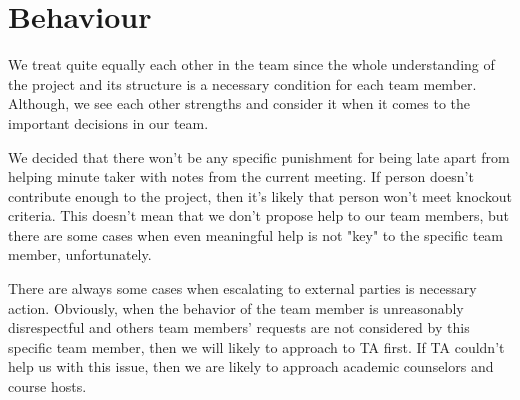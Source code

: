 \section{Behaviour}

We treat quite equally each other in the team since the whole understanding of the project and its structure is a necessary condition for each team member.
Although, we see each other strengths and consider it when it comes to the important decisions in our team.

We decided that there won't be any specific punishment for being late apart from helping minute taker with notes from the current meeting.
If person doesn't contribute enough to the project, then it's likely that person won't meet knockout criteria.
This doesn't mean that we don't propose help to our team members, but there are some cases when even meaningful help
is not "key" to the specific team member, unfortunately.

There are always some cases when escalating to external parties is necessary action.
Obviously, when the behavior of the team member is unreasonably disrespectful and others team members'
requests are not considered by this specific team member, then we will likely to approach to TA first.
If TA couldn't help us with this issue, then we are likely to approach academic counselors and course hosts.